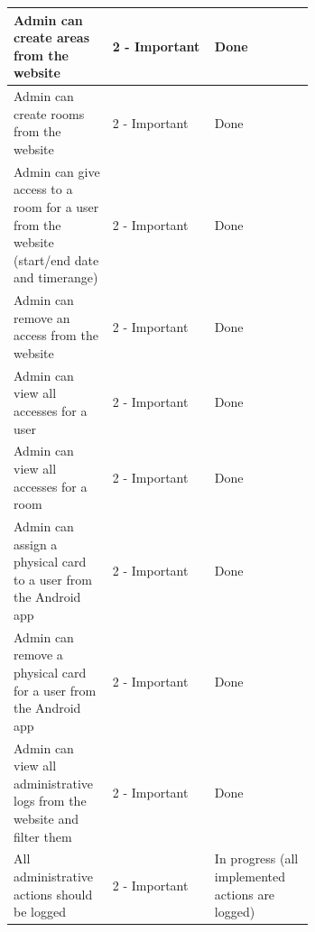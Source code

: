 \documentclass[11pt,a4paper]{report}
\begin{document}
\begin{longtable}[c]{|p{0.33\linewidth}|l|p{0.33\linewidth}|}
Admin can create areas from the website                                                                                                        & 2 - Important     & Done                                             \\ \hline
Admin can create rooms from the website                                                                                                        & 2 - Important     & Done                                             \\ \hline
Admin can give access to a room for a user from the website (start/end date and timerange)                                                     & 2 - Important     & Done                                             \\ \hline
Admin can remove an access from the website                                                                                                    & 2 - Important     & Done                                             \\ \hline
Admin can view all accesses for a user                                                                                                         & 2 - Important     & Done                                             \\ \hline
Admin can view all accesses for a room                                                                                                         & 2 - Important     & Done                                             \\ \hline
Admin can assign a physical card to a user from the Android app                                                                                & 2 - Important     & Done                                             \\ \hline
Admin can remove a physical card for a user from the Android app                                                                               & 2 - Important     & Done                                             \\ \hline
Admin can view all administrative logs from the website and filter them                                                                        & 2 - Important     & Done                                             \\ \hline
All administrative actions should be logged                                                                                                    & 2 - Important     & In progress (all implemented actions are logged) \\ \hline

\end{longtable}
\end{document}
